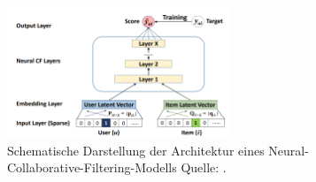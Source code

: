 \begin{figure}[H]
    \centering
    \includegraphics[width=0.6\textwidth]{content/figures/png/img_ncf_diagram.png}
    \caption{Schematische Darstellung der Architektur eines 
    Neural-Collaborative-Filtering-Modells Quelle: \Cite{he_neural_2017}.}
    \label{fig:ncf_architektur}
\end{figure}